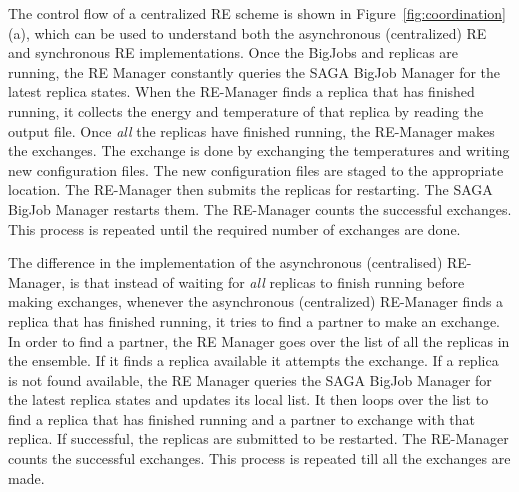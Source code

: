 \documentclass{rspublic}
\newcommand{\jhanote}[1]{ {\textcolor{red} { ***shantenu: #1 }}}
\newcommand{\alnote}[1]{ {\textcolor{blue} { ***andre: #1 }}}
\newcommand{\alnote}[1]{}
\newcommand{\jhanote}[1]{}
\begin{document}


The control flow of a centralized RE scheme is shown in
Figure~\ref{fig:coordination}(a), which can be used to understand both
the asynchronous (centralized) RE and synchronous RE implementations.
Once the BigJobs and replicas are running, the RE Manager constantly
queries the SAGA BigJob Manager for the latest replica states.  When
the RE-Manager finds a replica that has finished running, it collects
the energy and temperature of that replica by reading the output
file. Once \emph{all} the replicas have finished running, the
RE-Manager makes the exchanges. The exchange is done by exchanging the
temperatures and writing new configuration files. The new
configuration files are staged to the appropriate location. The
RE-Manager then submits the replicas for restarting. %
The SAGA BigJob Manager restarts them. The RE-Manager
counts the successful exchanges. This process is repeated until the
required number of exchanges are done.

The difference in the implementation of the asynchronous (centralised)
RE-Manager, is that instead of waiting for \emph{all} replicas to
finish running before making exchanges, whenever the asynchronous
(centralized) RE-Manager finds a replica that has finished running, it
tries to find a partner to make an exchange. In order to find a
partner, the RE Manager goes over the list of all the replicas in the
ensemble. If it finds a replica available it attempts the exchange. If
a replica is not found available, the RE Manager queries the SAGA
BigJob Manager for the latest replica states and updates its local
list. It then loops over the list to find a replica that has finished
running and a partner to exchange with that replica.  If successful,
the replicas are submitted to be
restarted. %
The RE-Manager counts the successful
exchanges. This process is repeated till all the exchanges are made.


\end{document}
